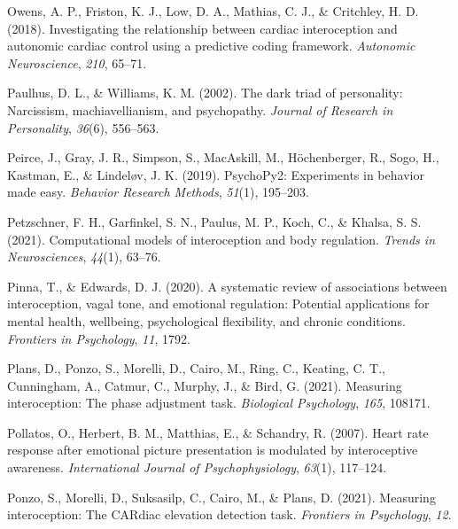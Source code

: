 \documentclass[
  man,mask,floatsintext]{apa6}
\newlength{\cslhangindent}
\newlength{\cslentryspacingunit} %
\newenvironment{CSLReferences}[2] %
 {%
  \setlength{\parindent}{0pt}
  \ifodd #1
  \let\oldpar\par
  \def\par{\hangindent=\cslhangindent\oldpar}
  \fi
  \setlength{\parskip}{#2\cslentryspacingunit}
 }%
 {}
\begin{document}
\begin{CSLReferences}{1}{0}
\leavevmode{}%
Owens, A. P., Friston, K. J., Low, D. A., Mathias, C. J., \& Critchley, H. D. (2018). Investigating the relationship between cardiac interoception and autonomic cardiac control using a predictive coding framework. \emph{Autonomic Neuroscience}, \emph{210}, 65--71.

\leavevmode{}%
Paulhus, D. L., \& Williams, K. M. (2002). The dark triad of personality: Narcissism, machiavellianism, and psychopathy. \emph{Journal of Research in Personality}, \emph{36}(6), 556--563.

\leavevmode{}%
Peirce, J., Gray, J. R., Simpson, S., MacAskill, M., Höchenberger, R., Sogo, H., Kastman, E., \& Lindeløv, J. K. (2019). PsychoPy2: Experiments in behavior made easy. \emph{Behavior Research Methods}, \emph{51}(1), 195--203.

\leavevmode{}%
Petzschner, F. H., Garfinkel, S. N., Paulus, M. P., Koch, C., \& Khalsa, S. S. (2021). Computational models of interoception and body regulation. \emph{Trends in Neurosciences}, \emph{44}(1), 63--76.

\leavevmode{}%
Pinna, T., \& Edwards, D. J. (2020). A systematic review of associations between interoception, vagal tone, and emotional regulation: Potential applications for mental health, wellbeing, psychological flexibility, and chronic conditions. \emph{Frontiers in Psychology}, \emph{11}, 1792.

\leavevmode{}%
Plans, D., Ponzo, S., Morelli, D., Cairo, M., Ring, C., Keating, C. T., Cunningham, A., Catmur, C., Murphy, J., \& Bird, G. (2021). Measuring interoception: The phase adjustment task. \emph{Biological Psychology}, \emph{165}, 108171.

\leavevmode{}%
Pollatos, O., Herbert, B. M., Matthias, E., \& Schandry, R. (2007). Heart rate response after emotional picture presentation is modulated by interoceptive awareness. \emph{International Journal of Psychophysiology}, \emph{63}(1), 117--124.

\leavevmode{}%
Ponzo, S., Morelli, D., Suksasilp, C., Cairo, M., \& Plans, D. (2021). Measuring interoception: The CARdiac elevation detection task. \emph{Frontiers in Psychology}, \emph{12}.


\end{CSLReferences}
\end{document}
